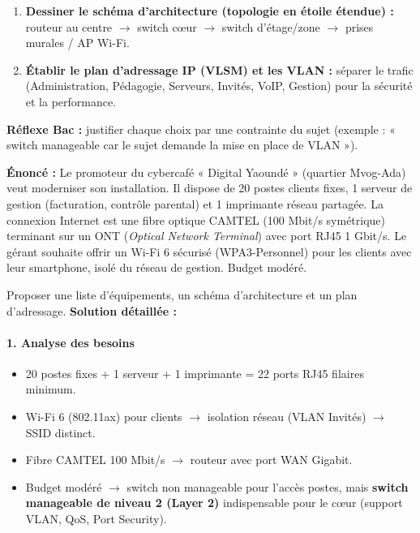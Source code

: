\documentclass[11pt]{article}
\begin{document}
\begin{methode}
\begin{enumerate}
\begin{itemize}
    \end{itemize}
    \item \textbf{Dessiner le schéma d'architecture (topologie en étoile étendue) :} routeur au centre $\rightarrow$ switch cœur $\rightarrow$ switch d'étage/zone $\rightarrow$ prises murales / AP Wi-Fi.
    \item \textbf{Établir le plan d'adressage IP (VLSM) et les VLAN :} séparer le trafic (Administration, Pédagogie, Serveurs, Invités, VoIP, Gestion) pour la sécurité et la performance.
\end{enumerate}
\textbf{Réflexe Bac :} justifier chaque choix par une contrainte du sujet (exemple : « switch manageable car le sujet demande la mise en place de VLAN »).
\end{methode}

\begin{exoresolu}
\textbf{Énoncé :} Le promoteur du cybercafé « Digital Yaoundé » (quartier Mvog-Ada) veut moderniser son installation. Il dispose de 20 postes clients fixes, 1 serveur de gestion (facturation, contrôle parental) et 1 imprimante réseau partagée. La connexion Internet est une fibre optique CAMTEL (100 Mbit/s symétrique) terminant sur un ONT (\emph{Optical Network Terminal}) avec port RJ45 1 Gbit/s. Le gérant souhaite offrir un Wi-Fi 6 sécurisé (WPA3-Personnel) pour les clients avec leur smartphone, isolé du réseau de gestion. Budget modéré.\par
Proposer une liste d'équipements, un schéma d'architecture et un plan d'adressage.
\tcblower
\textbf{Solution détaillée :}

\paragraph{1. Analyse des besoins}
\begin{itemize}
    \item 20 postes fixes + 1 serveur + 1 imprimante = 22 ports RJ45 filaires minimum.
    \item Wi-Fi 6 (802.11ax) pour clients $\rightarrow$ isolation réseau (VLAN Invités) $\rightarrow$ SSID distinct.
    \item Fibre CAMTEL 100 Mbit/s $\rightarrow$ routeur avec port WAN Gigabit.
    \item Budget modéré $\rightarrow$ switch non manageable pour l'accès postes, mais \textbf{switch manageable de niveau 2 (Layer 2)} indispensable pour le cœur (support VLAN, QoS, Port Security).
\end{itemize}


\end{exoresolu}
\end{document}
